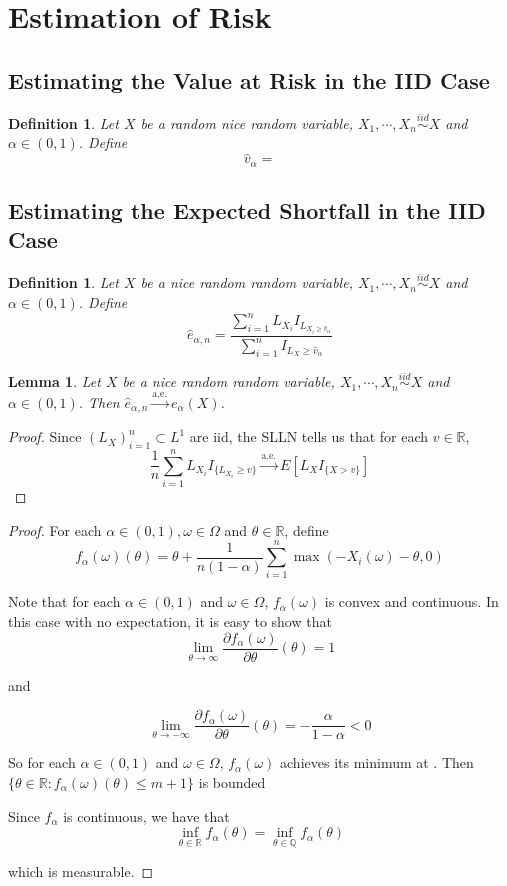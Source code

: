 \documentclass[12pt]{amsart}
\newtheorem{lem}[thm]{Lemma}
\newtheorem{defn}[thm]{Definition}
\newcommand{\al}{\alpha}
\newcommand{\om}{\omega}
\newcommand{\Om}{\Omega}
\newcommand{\R}{\mathbb{R}}
\newcommand{\Q}{\mathbb{Q}}
\newcommand{\convt}[1]{\xrightarrow{\text{#1}}}
\begin{document}
\section{Estimation of Risk}

\subsection{Estimating the Value at Risk in the IID Case}

\begin{defn}
Let $X$ be a random nice random variable, $X_1, \cdots , X_n \stackrel{iid}{\sim} X$ and $\al\in (0,1)$. Define $$\widehat{v}_\al = $$
\end{defn}

\subsection{Estimating the Expected Shortfall in the IID Case}

\begin{defn}
Let $X$ be a nice random random variable, $X_1, \cdots , X_n \stackrel{iid}{\sim} X$ and $\al\in (0,1)$. Define $$ \widehat{e}_{\al, n} = \frac{\sum_{i=1}^nL_{X_i}I_{L_{X_i \geq \widehat{v}_{\al}}}}{\sum_{i=1}^nI_{L_X \geq \widehat{v}_{\al}}} $$ 
\end{defn}

\begin{lem}
Let $X$ be a nice random random variable, $X_1, \cdots , X_n
\stackrel{iid}{\sim} X$ and $\al \in (0,1)$. Then $\widehat{e}_{\al, n} \convt{a.e.} e_{\al}(X)$.
\end{lem}

\begin{proof}
	Since $(L_X)_{i = 1}^n \subset L^1$ are iid, the SLLN tells us that for each $v \in \R$, $$\frac{1}{n}\sum_{i=1}^n L_{X_i}I_{\{L_{X_i} \geq v\}} \convt{a.e.} E[L_XI_{\{X > v\}}]$$
\end{proof}

\begin{proof}
For each $\al\in (0,1), \om \in \Om$ and $\theta \in \R$, define $$f_{\al}(\om)(\theta) = \theta + \frac{1}{n (1-\al)} \sum_{i=1}^n\max(-X_i(\om) - \theta, 0) $$ 

Note that for each $\al\in (0,1)$ and $\om \in \Om$, $f_{\al}(\om)$ is convex and continuous. In this case with no expectation, it is easy to show that $$\lim_{\theta \rightarrow \infty}\frac{\partial f_{\al}(\om)}{\partial \theta}(\theta) = 1$$

and
 
$$\lim_{\theta \rightarrow -\infty}\frac{\partial f_{\al}(\om)}{\partial \theta}(\theta) = -\frac{\al}{1-\al} <0$$  

So for each $\al\in (0,1)$ and $\om \in \Om$, $f_{\al}(\om)$ achieves its minimum at . Then $\{\theta \in \R: f_{\al}(\om)(\theta)\leq m+1\}$ is bounded

Since $f_{\al}$ is continuous, we have that $$\inf_{\theta \in \R} f_{\al}(\theta) = \inf_{\theta \in \Q} f_{\al}(\theta)$$ 

which is measurable. 

\end{proof} 



\end{document}
